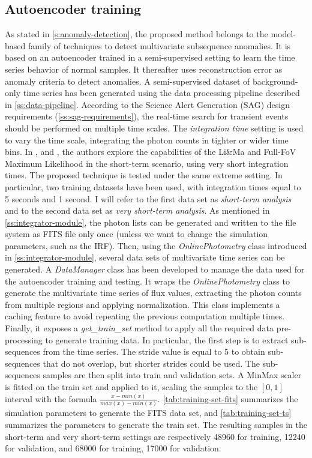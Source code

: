 \subsection{Autoencoder training}
As stated in \autoref{s:anomaly-detection}, the proposed method belongs to the model-based family of techniques to detect multivariate subsequence anomalies. It is based on an autoencoder trained in a semi-supervised setting to  learn the time series behavior of normal samples. It thereafter uses reconstruction error as anomaly criteria to detect anomalies. A semi-supervised dataset of background-only time series has been generated using the data processing pipeline described in \autoref{ss:data-pipeline}. According to the Science Alert Generation (SAG) design requirements (\autoref{ss:sag-requirements}), the real-time search for transient events should be performed on multiple time scales. The \textit{integration time} setting is used to vary the time scale, integrating the photon counts in tighter or wider time bins. In \cite{tampieri2020real}, and \cite{di2021detection}, the authors explore the capabilities of the Li\&Ma and Full-FoV Maximum Likelihood in the short-term scenario, using very short integration times. The proposed technique is tested under the same extreme setting. In particular, two training datasets have been used, with integration times equal to 5 seconds and 1 second. I will refer to the first data set as \textit{short-term analysis} and to the second data set as \textit{very short-term analysis}. As mentioned in \autoref{ss:integrator-module}, the photon lists can be generated and written to the file system as FITS file only once (unless we want to change the simulation parameters, such as the IRF). Then, using the \textit{OnlinePhotometry} class introduced in \autoref{ss:integrator-module}, several data sets of multivariate time series can be generated. A \textit{DataManager} class has been developed to manage the data used for the autoencoder training and testing. It wraps the \textit{OnlinePhotometry} class to generate the multivariate time series of flux values, extracting the photon counts from multiple regions and applying normalization. This class implements a caching feature to avoid repeating the previous computation multiple times. Finally, it exposes a \textit{get\_train\_set} method to apply all the required data pre-processing to generate training data. In particular, the first step is to extract sub-sequences from the time series. The stride value is equal to 5 to obtain sub-sequences that do not overlap, but shorter strides could be used. The sub-sequences samples are then split into train and validation sets. A MinMax scaler is fitted on the train set and applied to it, scaling the samples to the $[0, 1]$ interval with the formula $ \frac{x-min(x)}{max(x)-min(x)}$. \autoref{tab:training-set-fits} summarizes the simulation parameters to generate the FITS data set, and \autoref{tab:training-set-ts} summarizes the parameters to generate the train set. The resulting samples in the short-term and very short-term settings are respectively 48960 for training, 12240 for validation, and 68000 for training, 17000 for validation. 
